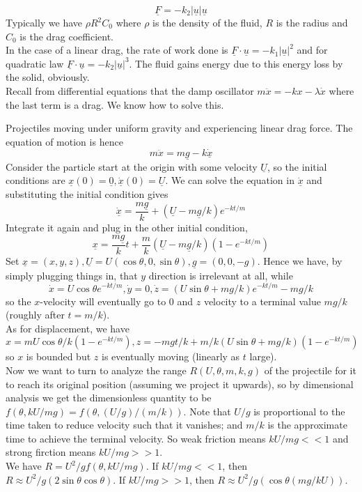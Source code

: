 $$\underline{F}=-k_2|\underline{u}|\underline{u}$$
Typically we have $\rho R^2C_0$ where $\rho$ is the density of the fluid, $R$ is the radius and $C_0$ is the drag coefficient.\\
In the case of a linear drag, the rate of work done is $\underline{F}\cdot\underline{u}=-k_1|\underline{u}|^2$ and for quadratic law $\underline{F}\cdot\underline{u}=-k_2|\underline{u}|^3$.
The fluid gains energy due to this energy loss by the solid, obviously.\\
Recall from differential equations that the damp oscillator $m\ddot{x}=-kx-\lambda\dot{x}$ where the last term is a drag.
We know how to solve this.
\begin{example}
    Projectiles moving under uniform gravity and experiencing linear drag force.
    The equation of motion is hence
    $$m\ddot{x}=m\underline{g}-k\underline{\dot{x}}$$
    Consider the particle start at the origin with some velocity $\underline{U}$, so the initial conditions are $\underline{x}(0)=\underline{0},\underline{\dot{x}}(0)=\underline{U}$.
    We can solve the equation in $\underline{\dot{x}}$ and substituting the initial condition gives
    $$\underline{\dot{x}}=\frac{m\underline{g}}{k}+(\underline{U}-m\underline{g}/k)e^{-kt/m}$$
    Integrate it again and plug in the other initial condition,
    $$\underline{x}=\frac{m\underline{g}}{k}t+\frac{m}{k}(\underline{U}-m\underline{g}/k)(1-e^{-kt/m})$$
    Set $\underline{x}=(x,y,z),\underline{U}=U(\cos\theta,0,\sin\theta),\underline{g}=(0,0,-g)$.
    Hence we have, by simply plugging things in, that $y$ direction is irrelevant at all, while
    $$\dot{x}=U\cos\theta e^{-kt/m},\dot{y}=0,\dot{z}=(U\sin\theta+mg/k)e^{-kt/m}-mg/k$$
    so the $x$-velocity will eventually go to $0$ and $z$ velocity to a terminal value $mg/k$ (roughly after $t=m/k$).\\
    As for displacement, we have
    $$x=mU\cos\theta/k(1-e^{-kt/m}),z=-mgt/k+m/k(U\sin\theta+mg/k)(1-e^{-kt/m})$$
    so $x$ is bounded but $z$ is eventually moving (linearly as $t$ large).\\
    Now we want to turn to analyze the range $R(U,\theta,m,k,g)$ of the projectile for it to reach its original position (assuming we project it upwards), so by dimensional analysis we get the dimensionless quantity to be $f(\theta,kU/mg)=f(\theta,(U/g)/(m/k))$.
    Note that $U/g$ is proportional to the time taken to reduce velocity such that it vanishes; and $m/k$ is the approximate time to achieve the terminal velocity.
    So weak friction means $kU/mg<<1$ and strong firction means $kU/mg>>1$.\\
    We have $R=U^2/gf(\theta,kU/mg)$.
    If $kU/mg<<1$, then $R\approx U^2/g(2\sin\theta\cos\theta)$.
    If $kU/mg>>1$, then $R\approx U^2/g(\cos\theta(mg/kU))$.
\end{example}